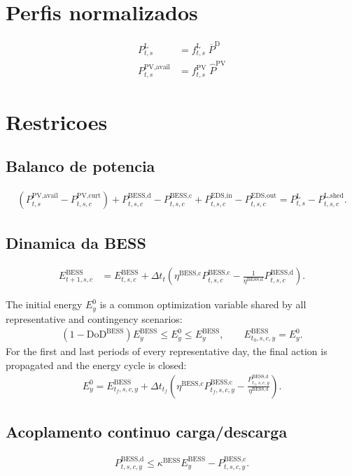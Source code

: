 \documentclass[11pt,a4paper]{article}
\begin{document}
\section{Perfis normalizados}
\begin{align}
P_{t,s}^{\text{L}} &= f_{t,s}^{\text{L}}\;\overline{P}^{\text{D}}\\
P_{t,s}^{\text{PV,avail}} &= f_{t,s}^{\text{PV}}\;\hat{P}^{\text{PV}}
\end{align}

\section{Restricoes}
\subsection*{Balanco de potencia}
\begin{align}
\left(P_{t,s}^{\text{PV,avail}} - P_{t,s,c}^{\text{PV,curt}}\right)
+ P_{t,s,c}^{\text{BESS,d}} - P_{t,s,c}^{\text{BESS,c}}
+ P_{t,s,c}^{\text{EDS,in}} - P_{t,s,c}^{\text{EDS,out}}
= P_{t,s}^{\text{L}} - P_{t,s,c}^{\text{L,shed}}.
\end{align}

\subsection*{Dinamica da BESS}
\begin{align}
E_{t+1,s,c}^{\text{BESS}} &=
E_{t,s,c}^{\text{BESS}} +
\Delta t_t\left(
\eta^{\text{BESS,c}} P_{t,s,c}^{\text{BESS,c}}
- \frac{1}{\eta^{\text{BESS,d}}} P_{t,s,c}^{\text{BESS,d}}
\right).
\end{align}

The initial energy $E_y^{0}$ is a common optimization variable shared by all
representative and contingency scenarios:
\begin{align}
(1-\text{DoD}^{\text{BESS}})E_y^{\text{BESS}}
\le E_y^0 \le E_y^{\text{BESS}}, \qquad
E_{t_0,s,c,y}^{\text{BESS}}=E_y^0.
\end{align}
For the first and last periods of every representative day, the final action
is propagated and the energy cycle is closed:
\begin{align}
E_y^0 = E_{t_f,s,c,y}^{\text{BESS}} +
\Delta t_{t_f}\left(
\eta^{\text{BESS,c}}P_{t_f,s,c,y}^{\text{BESS,c}}-
\frac{P_{t_f,s,c,y}^{\text{BESS,d}}}{\eta^{\text{BESS,d}}}
\right).
\end{align}

\subsection*{Acoplamento continuo carga/descarga}
\begin{align}
P_{t,s,c,y}^{\text{BESS,d}}
\le \kappa^{\text{BESS}}E_y^{\text{BESS}}
-P_{t,s,c,y}^{\text{BESS,c}}.
\end{align}
\end{document}
